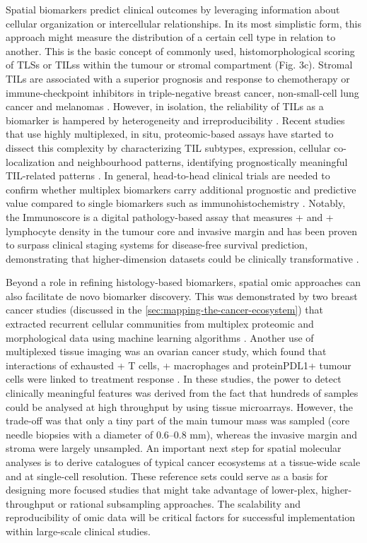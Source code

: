 Spatial biomarkers predict clinical outcomes by leveraging information about cellular organization or intercellular relationships. In its most simplistic form, this approach might measure the distribution of a certain cell type in relation to another. This is the basic concept of commonly used, histomorphological scoring of \acp{TLS} or \acp{TIL}s within the tumour or stromal compartment (Fig. 3c). Stromal TILs are associated with a superior prognosis and response to chemotherapy or immune-checkpoint inhibitors in triple-negative breast cancer, non-small-cell lung cancer and melanomas \parencite{Azimi2012-aa,Lee2016-hg,Helmink2020-gz,Chen2020-ua,Salgado2015-ne}. However, in isolation, the reliability of \acp{TIL} as a biomarker is hampered by heterogeneity and irreproducibility \parencite{Salgado2015-ne}. Recent studies that use highly multiplexed, in situ, proteomic-based assays have started to dissect this complexity by characterizing \ac{TIL} subtypes, expression, cellular co-localization and neighbourhood patterns, identifying prognostically meaningful \ac{TIL}-related patterns \parencite{Moldoveanu2022-qu,Keren2018-or}. In general, head-to-head clinical trials are needed to confirm whether multiplex biomarkers carry additional prognostic and predictive value compared to single biomarkers such as  immunohistochemistry \parencite{Lu2019-lo}. Notably, the Immunoscore \parencite{Galon2006-ow} is a digital pathology-based assay that measures + and + lymphocyte density in the tumour core and invasive margin and has been proven to surpass clinical staging systems for disease-free survival prediction, demonstrating that higher-dimension datasets could be clinically transformative \parencite{Pages2018-ka}.

Beyond a role in refining histology-based biomarkers, spatial omic approaches can also facilitate de novo biomarker discovery. This was demonstrated by two breast cancer studies (discussed in the \cref{sec:mapping-the-cancer-ecosystem}) that extracted recurrent cellular communities from multiplex proteomic and morphological data using machine learning algorithms \parencite{Danenberg2022-zb,Jackson2020-em}. Another use of multiplexed tissue imaging was an ovarian cancer study, which found that interactions of exhausted + T cells, + macrophages and protein{PDL1}+ tumour cells were linked to treatment response \parencite{Farkkila2020-gk}. In these studies, the power to detect clinically meaningful features was derived from the fact that hundreds of samples could be analysed at high throughput by using tissue microarrays. However, the trade-off was that only a tiny part of the main tumour mass was sampled (core needle biopsies with a diameter of 0.6–0.8 mm), whereas the invasive margin and stroma were largely unsampled. An important next step for spatial molecular analyses is to derive catalogues of typical cancer ecosystems at a tissue-wide scale and at single-cell resolution. These reference sets could serve as a basis for designing more focused studies that might take advantage of lower-plex, higher-throughput or rational subsampling approaches. The scalability and reproducibility of omic data will be critical factors for successful implementation within large-scale clinical studies.

